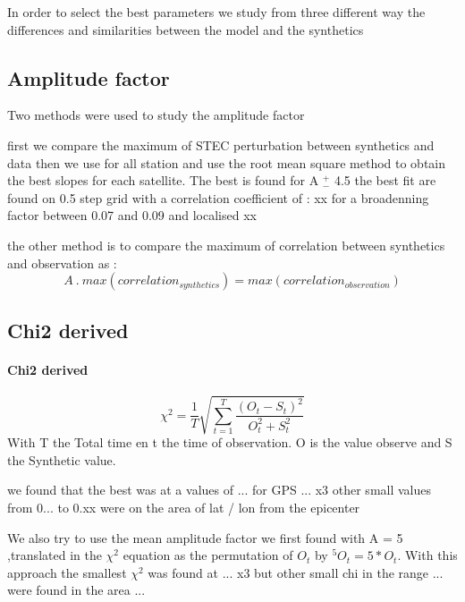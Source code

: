 \documentclass{gji}
\begin{document}
    
In order to select the best parameters we study from three different way the differences and similarities between the model and the synthetics

\subsection{Amplitude factor}

Two methods were used to study the amplitude factor 

first we compare the maximum of STEC perturbation between synthetics and data
then we use for all station and use the root mean square method to obtain the best slopes for each satellite. The best is found for A $^+_-$ 4.5 
the best fit are found on 0.5 step grid with a correlation coefficient of : xx for a broadenning factor between 0.07 and 0.09 and localised xx

the other method is to compare the maximum of correlation between synthetics and observation as :
\begin{equation}
A ~ .~ max(correlation_{synthetics}) =  max(correlation_{observation})
\end{equation}



\subsection{Chi2 derived}
\paragraph{Chi2 derived}
\begin{equation}
\chi^2 = \frac{1}{T}\sqrt{\sum_{t=1}^{T}\frac{(O_t-S_t)^2}{O_t^2 + S_t^2}} 
\end{equation}
With T the Total time en t the time of observation. O is the value observe and S the Synthetic value.

we found that the best was at a values of ... for GPS ... x3
other small values from 0... to 0.xx were on the area of lat / lon from the epicenter

We also try to use the mean amplitude factor we first found with A = 5 ,translated in the $\chi^2$ equation as the permutation of $O_t$ by $^5O _t = 5*O_t$. With this approach the smallest $\chi^2$ was found at ... x3 but other small chi in the range ... were found in the area ...
\end{document}

